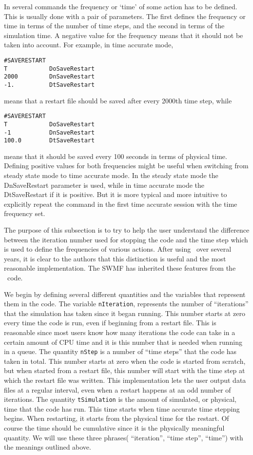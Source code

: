 In several commands the frequency or `time' of some action has
to be defined. This is usually done with a pair of parameters.
The first defines the frequency or time in terms of the number of time steps,
and the second in terms of the simulation time.
A negative value for the frequency means that it should not be taken 
into account. For example, in time accurate mode,
\begin{verbatim}
#SAVERESTART
T            DoSaveRestart
2000         DnSaveRestart
-1.          DtSaveRestart
\end{verbatim}
means that a restart file should be saved after every 2000th time step, while
\begin{verbatim}
#SAVERESTART
T            DoSaveRestart
-1           DnSaveRestart
100.0        DtSaveRestart
\end{verbatim}
means that it should be saved every 100 seconds in terms of physical time.
Defining positive values for both frequencies might be useful
when switching from steady state mode to time accurate mode.
In the steady state mode the DnSaveRestart parameter is used,
while in time accurate mode the DtSaveRestart if it is positive.
But it is more typical and more intuitive 
to explicitly repeat the command in the first 
time accurate session with the time frequency set.

The purpose of this subsection is to try to help the user understand 
the difference between the iteration number used for stopping the code
and the time step which is used to define the frequencies of various
actions. After using \BATSRUS\ over several years, it is clear to the
authors that this distinction is useful and the
most reasonable implementation. The SWMF has inherited these
features from the \BATSRUS\ code.

We begin by defining several different quantities and the variables that 
represent them in the code.  The variable {\tt nIteration}, 
represents the number of ``iterations'' 
that the simulation has taken since it began running.  
This number starts at zero every time the code is run, even if beginning 
from a restart file.
This is reasonable since most users know how many iterations the code can take
in a certain amount of CPU time and it is this number that is needed when 
running in a queue.
The quantity {\tt nStep} is a number of ``time steps'' that the code has 
taken in total.  This number starts at zero when the code is started from 
scratch, but when started from a restart file, this
number will start with the time step at which the restart file was written.
This implementation lets the user output data files at a regular interval, even
when a restart happens at an odd number of iterations.
The quantity {\tt tSimulation} is the amount of simulated, or physical, 
time that the code has run.  
This time starts when time accurate time stepping begins.
When restarting, it starts from the physical time for the restart.
Of course the time should be cumulative since it is the physically meaningful
quantity.  We will 
use these three phrases( ``iteration'', ``time step'', ``time'') 
with the meanings outlined above.

